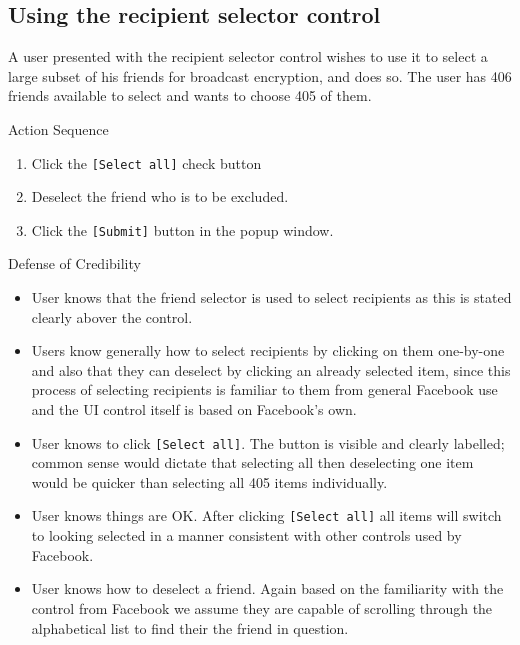 \subsection{Using the recipient selector control}
A user presented with the recipient selector control wishes to use it to select a large subset of his friends for broadcast encryption, and does so. The user has 406 friends available to select and wants to choose 405 of them.

\begin{desc}

    \item[Action Sequence] \hfill
    \begin{enumerate}
        \item Click the {\tt [Select all]} check button
        \item Deselect the friend who is to be excluded.
        \item Click the {\tt [Submit]} button in the popup window.
    \end{enumerate}
    
    \item[Defense of Credibility] \hfill
        \begin{itemize}
            
            \item User knows that the friend selector is used to select recipients as this is stated clearly abover the control.
            
            \item Users know generally how to select recipients by clicking on them one-by-one and also that they can deselect by clicking an already selected item, since this process of selecting recipients is familiar to them from general Facebook use and the UI control itself is based on Facebook's own. 
            
            \item User knows to click {\tt [Select all]}. The button is visible and clearly labelled; common sense would dictate that selecting all then deselecting one item would be quicker than selecting all 405 items individually.
            
            \item User knows things are OK. After clicking {\tt [Select all]} all items will switch to looking selected in a manner consistent with other controls used by Facebook.
            
            \item User knows how to deselect a friend. Again based on the familiarity with the control from Facebook we assume they are capable of scrolling through the alphabetical list to find their the friend in question.
            

\end{itemize}
\end{desc}

